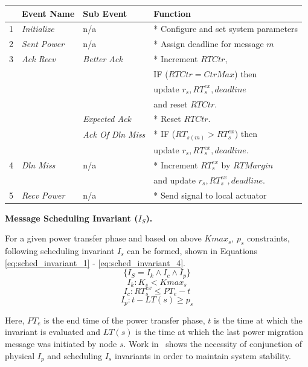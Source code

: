 \begin{scriptsize}
\begin{tabular}{| l | l | l | l |}
	\hline
		&   \textbf{Event Name}	&	\textbf{Sub Event} 			&	\textbf{Function} \\ \hline
	1	&	\textit{Initialize}	&	n/a							&	* Configure and set system parameters \\ \hline
	2	&	\textit{Sent Power}	&	n/a							&	* Assign deadline for message $m$ \\ \hline
	3	&	\textit{Ack Recv}	&	\textit{Better Ack}			&	* Increment $RTCtr$, \\
		&						&								&	IF ($RTCtr=CtrMax$) then \\
		&						&								&	update $r_s, RT_s^{ex}, deadline$ \\
		&						&								&	and reset $RTCtr$. \\
		&						&	\textit{Expected Ack}		&	* Reset $RTCtr$. \\
		&						&	\textit{Ack Of Dln Miss}	&	* IF ($RT_{s(m)}>RT_s^{ex}$) then \\
		&						&								&	update $r_s, RT_s^{ex}, deadline$. \\ \hline	
	4	&	\textit{Dln Miss}	&	n/a							&	* Increment $RT_s^{ex}$ by $RTMargin$ \\
		&						&								&	and update $r_s, RT_s^{ex}, deadline$. \\ \hline
	5	&	\textit{Recv Power}	&	n/a							&	* Send signal to local actuator\\
	\hline
\end{tabular}
\end{scriptsize}


{\bf Message Scheduling Invariant ($I_S$).}

For a given power transfer phase and based on above $Kmax_s$, $p_s$ constraints, following scheduling invariant
$I_s$ can be formed, shown in
Equations \ref{eq:sched_invariant_1} - \ref{eq:sched_invariant_4}.
\begin{equation}
\{I_S = I_k \wedge I_c \wedge I_p\}
\label{eq:sched_invariant_1} 
\end{equation}
\begin{equation}
I_k: K_s < Kmax_s 
\label{eq:sched_invariant_2}
\end{equation}
\begin{equation}
I_c: RT_s^{ex} \leq PT_e - t 
\label{eq:sched_invariant_3}
\end{equation}
\begin{equation}
I_p: t - LT(s) \geq p_s
\label{eq:sched_invariant_4}
\end{equation}

Here, $PT_e$ is the end time of the power transfer phase, $t$ is the time at which
the invariant is evaluated and $LT(s)$ is the time at which the last power
migration message was initiated by node $s$. Work in~\cite{acsmartgrid} shows the necessity of 
conjunction of physical $I_p$ and scheduling $I_s$ invariants in order
to maintain system stability.